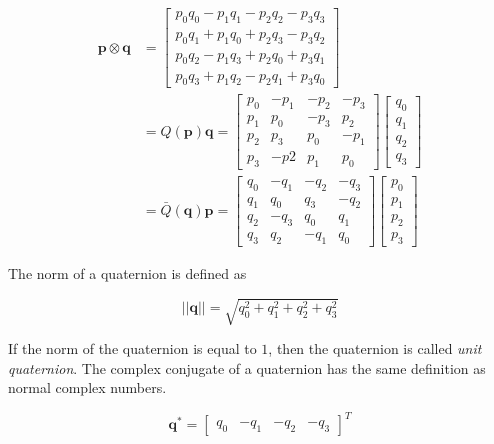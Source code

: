 \begin{align}
	\mathbf{p} \otimes \mathbf{q} &=
	\begin{bmatrix}
		p_0q_0 - p_1q_1 - p_2q_2 - p_3q_3 \\
		p_0q_1 + p_1q_0 + p_2q_3 - p_3q_2 \\
		p_0q_2 - p_1q_3 + p_2q_0 + p_3q_1 \\
		p_0q_3 + p_1q_2 - p_2q_1 + p_3q_0
	\end{bmatrix} \\
	&= Q(\mathbf{p})\mathbf{q} =
	\begin{bmatrix}
		p_0 & -p_1 & -p_2 & -p_3 \\
		p_1 & p_0  & -p_3 & p_2 \\
		p_2 & p_3  & p_0  & -p_1 \\
		p_3 & -p2  & p_1  & p_0
	\end{bmatrix}
	\begin{bmatrix}
		q_0 \\
		q_1 \\
		q_2 \\
		q_3
	\end{bmatrix} \\
	&= \bar{Q}(\mathbf{q})\mathbf{p} = 
	\begin{bmatrix}
		q_0 & -q_1 & -q_2 & -q_3 \\
		q_1 & q_0  & q_3  & -q_2 \\
		q_2 & -q_3 & q_0  & q_1 \\
		q_3 & q_2  & -q_1 & q_0  
	\end{bmatrix}
	\begin{bmatrix}
		p_0 \\
		p_1 \\
		p_2 \\
		p_3
	\end{bmatrix}
	\label{eq:quatKronecker}
\end{align}

\noindent The norm of a quaternion is defined as

\begin{equation}
	||\mathbf{q}|| = \sqrt{q_0^2 + q_1^2 + q_2^2 + q_3^2} 
	\label{eq:quatNorm}
\end{equation}

\noindent If the norm of the quaternion is equal to $1$, then the quaternion is called \textit{unit quaternion}. The complex conjugate of a quaternion has the same definition as normal complex numbers.

\begin{equation}
	\mathbf{q}^* = 
	\begin{bmatrix}
		q_0 & -q_1 & -q_2 & -q_3
	\end{bmatrix}^T
	\label{eq:quatConj}
\end{equation}


